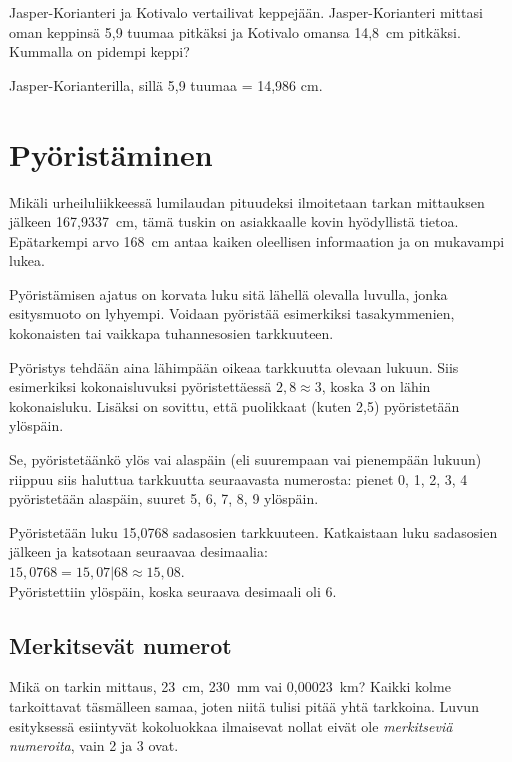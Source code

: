 \begin{tehtava}
Jasper-Korianteri ja Kotivalo vertailivat keppejään. Jasper-Korianteri mittasi oman keppinsä 5,9 tuumaa pitkäksi ja Kotivalo omansa 14,8~cm pitkäksi. Kummalla on pidempi keppi?
\begin{vastaus}
Jasper-Korianterilla, sillä 5,9 tuumaa = 14,986 cm.
\end{vastaus}
\end{tehtava}

\section*{Pyöristäminen}

Mikäli urheiluliikkeessä lumilaudan pituudeksi ilmoitetaan tarkan mittauksen jälkeen 167,9337~cm, tämä tuskin on asiakkaalle kovin hyödyllistä tietoa. Epätarkempi arvo 168~cm antaa kaiken oleellisen informaation ja on mukavampi lukea.

Pyöristämisen ajatus on korvata luku sitä lähellä olevalla luvulla, jonka esitysmuoto on lyhyempi. Voidaan pyöristää
esimerkiksi tasakymmenien, kokonaisten tai vaikkapa tuhannesosien
tarkkuuteen.

Pyöristys tehdään aina lähimpään oikeaa tarkkuutta olevaan lukuun. Siis esimerkiksi kokonaisluvuksi pyöristettäessä $2,8 \approx 3$, koska 3 on lähin kokonaisluku. Lisäksi on sovittu, että
puolikkaat (kuten 2,5) pyöristetään ylöspäin.

Se, pyöristetäänkö ylös vai alaspäin (eli suurempaan vai
pienempään lukuun) riippuu siis haluttua tarkkuutta
seuraavasta numerosta: pienet
0, 1, 2, 3, 4 pyöristetään alaspäin, suuret 5, 6, 7, 8, 9 ylöspäin.

\begin{esimerkki}
Pyöristetään luku 15,0768 sadasosien tarkkuuteen. Katkaistaan
luku sadasosien jälkeen ja katsotaan seuraavaa desimaalia:\\
$15,0768 = 15,07|68 \approx 15,08$.\\
Pyöristettiin ylöspäin, koska seuraava desimaali oli 6.
\end{esimerkki}

\subsection*{Merkitsevät numerot}

Mikä on tarkin mittaus, 23~cm, 230~mm vai 0,00023~km? Kaikki kolme tarkoittavat täsmälleen samaa, joten niitä tulisi pitää
yhtä tarkkoina. Luvun esityksessä esiintyvät kokoluokkaa ilmaisevat nollat eivät ole \emph{merkitseviä numeroita}, vain
2 ja 3 ovat.

